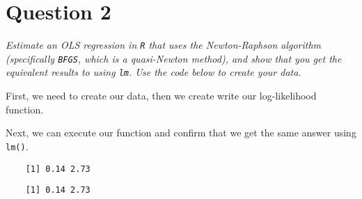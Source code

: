 \documentclass[12pt,letterpaper]{article}
\begin{document}
\section*{Question 2}
\noindent \emph{Estimate an OLS regression in \texttt{R} that uses the Newton-Raphson algorithm (specifically \texttt{BFGS}, which is a quasi-Newton method), and show that you get the equivalent results to using \texttt{lm}. Use the code below to create your data.}
\vspace{.5cm}
 

\noindent First, we need to create our data, then we create write our log-likelihood function.

 

\noindent Next, we can execute our function and confirm that we get the same answer using \texttt{lm()}.

 

	\begin{lstlisting}
	[1] 0.14 2.73 \end{lstlisting}

 

	\begin{lstlisting}
	[1] 0.14 2.73 \end{lstlisting}
\end{document}
